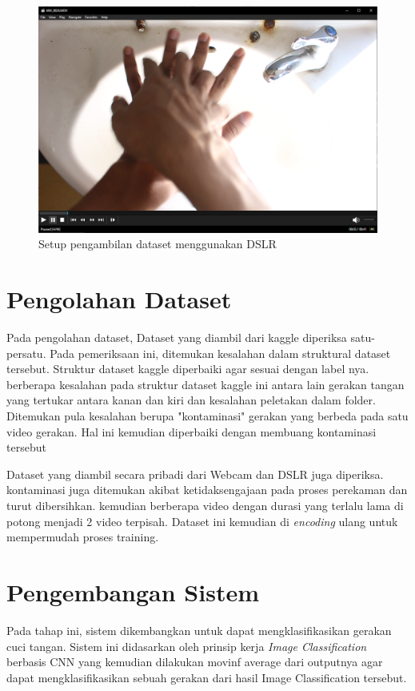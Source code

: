 \begin{figure}[!ht]
	\centering
	\includegraphics[width=0.8\columnwidth]{gambar/contohdslr2.png}
	\caption{Setup pengambilan dataset menggunakan DSLR}
	\label{fig:contohdslr}
\end{figure}

\section{Pengolahan Dataset}
\label{sec:pengolahandataset}

Pada pengolahan dataset, Dataset yang diambil dari kaggle diperiksa satu-persatu. Pada pemeriksaan ini, ditemukan kesalahan dalam struktural dataset tersebut. Struktur dataset kaggle diperbaiki agar sesuai dengan label nya. berberapa kesalahan pada struktur dataset kaggle ini antara lain gerakan tangan yang tertukar antara kanan dan kiri dan kesalahan peletakan dalam folder. Ditemukan pula kesalahan berupa "kontaminasi" gerakan yang berbeda pada satu video gerakan. Hal ini kemudian diperbaiki dengan membuang kontaminasi tersebut

Dataset yang diambil secara pribadi dari Webcam dan DSLR juga diperiksa. kontaminasi juga ditemukan akibat ketidaksengajaan pada proses perekaman dan turut dibersihkan. kemudian berberapa video dengan durasi yang terlalu lama di potong menjadi 2 video terpisah. Dataset ini kemudian di \textit{encoding} ulang untuk mempermudah proses training.

\section{Pengembangan Sistem}
\label{sec:pengembangansistem}

Pada tahap ini, sistem dikembangkan untuk dapat mengklasifikasikan gerakan cuci tangan. Sistem ini didasarkan oleh prinsip kerja \textit{Image Classification} berbasis CNN yang kemudian dilakukan movinf average dari outputnya agar dapat mengklasifikasikan sebuah gerakan dari hasil Image Classification tersebut.


